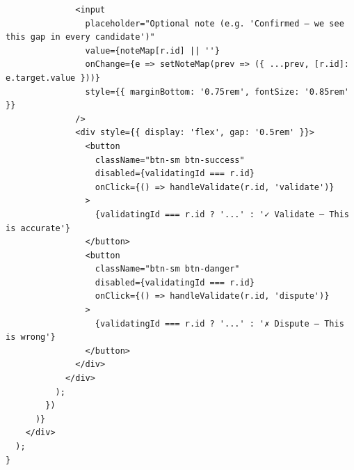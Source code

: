 \documentclass[12pt,a4paper]{report}
\begin{document}
\begin{verbatim}
              <input
                placeholder="Optional note (e.g. 'Confirmed — we see this gap in every candidate')"
                value={noteMap[r.id] || ''}
                onChange={e => setNoteMap(prev => ({ ...prev, [r.id]: e.target.value }))}
                style={{ marginBottom: '0.75rem', fontSize: '0.85rem' }}
              />
              <div style={{ display: 'flex', gap: '0.5rem' }}>
                <button
                  className="btn-sm btn-success"
                  disabled={validatingId === r.id}
                  onClick={() => handleValidate(r.id, 'validate')}
                >
                  {validatingId === r.id ? '...' : '✓ Validate — This is accurate'}
                </button>
                <button
                  className="btn-sm btn-danger"
                  disabled={validatingId === r.id}
                  onClick={() => handleValidate(r.id, 'dispute')}
                >
                  {validatingId === r.id ? '...' : '✗ Dispute — This is wrong'}
                </button>
              </div>
            </div>
          );
        })
      )}
    </div>
  );
}


\end{verbatim}
\end{document}
